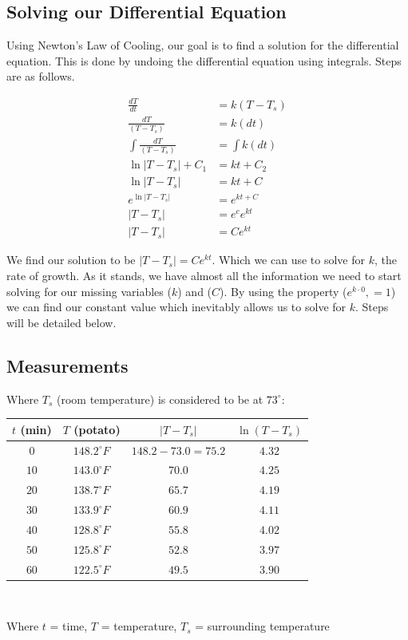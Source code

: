 \documentclass{article}
\begin{document}
\begin{center}
    
\end{center}

\newpage
\subsection{Solving our Differential Equation}
Using Newton's Law of Cooling, our goal is to find a solution for the differential equation. This is done by undoing the differential equation using integrals. Steps are as follows.

\begin{align}
    \frac{dT}{dt}&=k(T-T_s) \\[1em]
    \frac{dT}{(T-T_s)} &= k(dt) \\[1em]
    \int \frac{dT}{(T-T_s)} &= \int k(dt)\\[1em]
    \ln|T-T_s|+C_1 &= kt+C_2\\[1em]
    \ln|T-T_s| &= kt+C\\[1em]
    e^{\ln|T-T_s|} &= e^{kt+C}\\[1em]
    |T-T_s| &= e^{c}e^{kt}\\[1em]
    |T-T_s| &= Ce^{kt}
\end{align}

We find our solution to be $\boxed{|T-T_s| = Ce^{kt}}$. Which we can use to solve for $k$, the rate of growth. As it stands, we have almost all the information we need to start solving for our missing variables ($k$) and ($C$). By using the property ($e^{k\cdot 0}, = 1 $) we can find our constant value which inevitably allows us to solve for $k$. Steps will be detailed below.


\subsection{Measurements}
Where $T_s$  (room temperature) is considered to be at $73^{\circ}$:
\begin{center}
    \begin{tabular}{|c|c|c|c|}
    \hline
    $t$ (min) & $T$ (potato) & $|T-T_s|$ & $\ln(T-T_s)$  \\\hline
    $0$ & $148.2^{\circ} F$ & $148.2 - 73.0 = 75.2$ & $4.32$ \\\hline  
    $10$ & $143.0^{\circ} F$ & $70.0$ & $4.25$ \\\hline
    $20$ & $138.7^{\circ} F$ & $65.7$ & $4.19$ \\\hline
    $30$ & $133.9^{\circ} F$ & $60.9$ & $4.11$ \\\hline
    $40$ & $128.8^{\circ} F$ & $55.8$ & $4.02$ \\\hline
    $50$ & $125.8^{\circ} F$ & $52.8$ & $3.97$ \\\hline
    $60$ & $122.5^{\circ} F$ & $49.5$ & $3.90$\\\hline
    \end{tabular}\\[1em]
\end{center}
\begin{center}
    Where $t$ = time, $T$ = temperature, $T_s$ = surrounding temperature
\end{center}
\newpage
\end{document}

